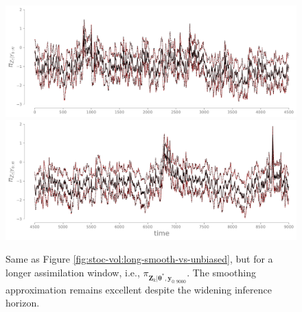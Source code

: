 \documentclass[twoside,11pt]{article}
\newcommand{\yb}{\boldsymbol{y}}
\newcommand{\Zb}{\boldsymbol{Z}}
\newcommand{\thetab}{\boldsymbol{\theta}}                              %
\begin{document}
%



%
%
%
%
%
%
%
%
%
%
%
\clearpage
\begin{figure}
\begin{center}
\includegraphics[width=.9\textwidth, bb=25bp 0bp 800bp 290bp, clip]{smoothing-marginals-vs-unbiased-timesteps-chunk-0_long_wide.pdf}
%
\includegraphics[width=.9\textwidth, bb=25bp 0bp 800bp 290bp, clip]{smoothing-marginals-vs-unbiased-timesteps-chunk-1_long_wide.pdf}
%
\caption{Same as Figure \ref{fig:stoc-vol:long-smooth-vs-unbiased}, but
for a longer assimilation window, i.e., $\pi_{ \Zb_{k} \vert \thetab^*, \yb_{0:9000}}$.
The smoothing approximation remains excellent despite the widening inference horizon. }
%
\label{fig:stoc-vol:very-long-smooth-vs-unbiased} 
\end{center}
\end{figure}
\clearpage

%
%
%

%
%
%
%
%


%
%

%
%

%
%
\end{document}
